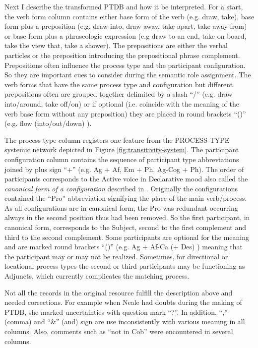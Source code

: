 Next I describe the transformed PTDB and how it be interpreted. For a start, the verb form column contains either base form of the verb (e.g. draw, take), base form plus a preposition (e.g. draw into, draw away, take apart, take away from) or base form plus a phraseologic expression (e.g draw to an end, take on board, take the view that, take a shower). The prepositions are either the verbal particles or the preposition introducing the prepositional phrase complement. Prepositions often influence the process type and the participant configuration. So they are important cues to consider during the semantic role assignment. The verb forms that have the same process type and configuration but different prepositions often are grouped together delimited by a slash ``/'' (e.g. draw into/around, take off/on) or if optional (i.e. coincide with the meaning of the verb base form without any preposition) they are placed in round brackets ``()'' (e.g. flow (into/out/down) ).

The process type column registers one feature from the PROCESS-TYPE systemic network depicted in Figure \ref{fig:transitivity-system}.
The participant configuration column contains the sequence of participant type abbreviations joined by plus sign ``+'' (e.g. Ag + Af, Em + Ph, Ag-Cog + Ph). The order of participants corresponds to the Active voice in Declarative mood also called the \textit{canonical form of a configuration} described in \citet{Fawcett2009}. Originally the configurations contained the ``Pro'' abbreviation signifying the place of the main verb/process. As all configurations are in canonical form, the Pro was redundant occurring always in the second position thus had been removed. So the first participant, in canonical form, corresponds to the Subject, second to the first complement and third to the second complement. Some participants are optional for the meaning and are marked round brackets ``()'' (e.g. Ag + Af-Ca (+ Des) ) meaning that the participant may or may not be realized. Sometimes, for directional or locational process types the second or third participants may be functioning as Adjuncts, which currently complicates the matching process.

Not all the records in the original resource fulfill the description above and needed corrections. For example when Neale had doubts during the making of PTDB, she marked uncertainties with question mark ``?''. In addition, ``,'' (comma) and ``\&'' (and) sign are use inconsistently with various meaning in all columns. Also, comments such as ``not in Cob'' were encountered in several columns. 

